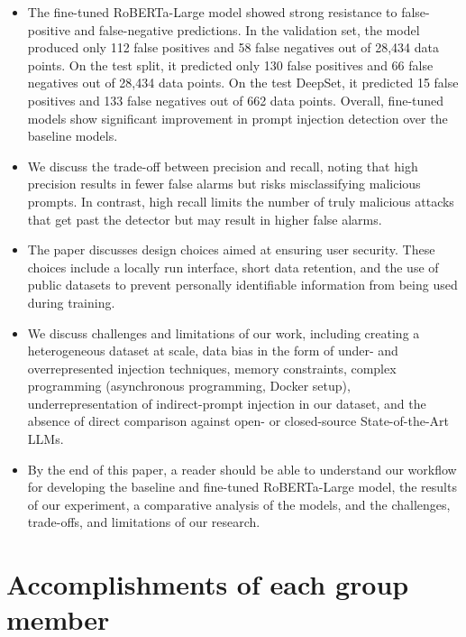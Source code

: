 \documentclass[12pt, letterpaper]{article}   %
\begin{document}
\begin{itemize}
    \item The fine-tuned RoBERTa-Large model showed strong resistance to false-positive and false-negative predictions. In the validation set, the model produced only 112 false positives and 58 false negatives out of 28,434 data points. On the test split, it predicted only 130 false positives and 66 false negatives out of 28,434 data points. On the test DeepSet, it predicted 15 false positives and 133 false negatives out of 662 data points. Overall, fine-tuned models show significant improvement in prompt injection detection over the baseline models.
    \item We discuss the trade-off between precision and recall, noting that high precision results in fewer false alarms but risks misclassifying malicious prompts. In contrast, high recall limits the number of truly malicious attacks that get past the detector but may result in higher false alarms.
    \item The paper discusses design choices aimed at ensuring user security. These choices include a locally run interface, short data retention, and the use of public datasets to prevent personally identifiable information from being used during training.
    \item We discuss challenges and limitations of our work, including creating a heterogeneous dataset at scale, data bias in the form of under- and overrepresented injection techniques, memory constraints, complex programming (asynchronous programming, Docker setup), underrepresentation of indirect-prompt injection in our dataset, and the absence of direct comparison against open- or closed-source State-of-the-Art LLMs.
    \item By the end of this paper, a reader should be able to understand our workflow for developing the baseline and fine-tuned RoBERTa-Large model, the results of our experiment, a comparative analysis of the models, and the challenges, trade-offs, and limitations of our research.
\end{itemize}


\section{Accomplishments of each group member}
\end{document}
